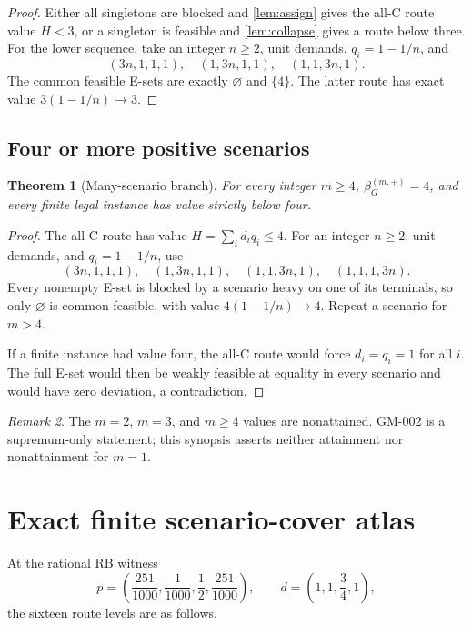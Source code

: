 \documentclass[11pt]{article}
\newtheorem{theorem}{Theorem}[section]
\theoremstyle{remark}
\newtheorem{remark}[theorem]{Remark}
\begin{document}
\begin{proof}
Either all singletons are blocked and \cref{lem:assign} gives the all-C route
value $H<3$, or a singleton is feasible and \cref{lem:collapse} gives a route
below three. For the lower sequence, take an integer $n\ge2$, unit demands,
$q_i=1-1/n$, and
\[
(3n,1,1,1),\quad(1,3n,1,1),\quad(1,1,3n,1).
\tag{3.6}
\]
The common feasible E-sets are exactly $\varnothing$ and $\{4\}$. The latter
route has exact value $3(1-1/n)\to3$.
\end{proof}

\subsection{Four or more positive scenarios}

\begin{theorem}[Many-scenario branch]\label{thm:m4}
For every integer $m\ge4$, $\beta_G^{(m,+)}=4$, and every finite legal
instance has value strictly below four.
\end{theorem}

\begin{proof}
The all-C route has value $H=\sum_i d_iq_i\le4$. For an integer $n\ge2$,
unit demands, and $q_i=1-1/n$, use
\[
(3n,1,1,1),\quad(1,3n,1,1),\quad
(1,1,3n,1),\quad(1,1,1,3n).
\tag{3.7}
\]
Every nonempty E-set is blocked by a scenario heavy on one of its terminals,
so only $\varnothing$ is common feasible, with value $4(1-1/n)\to4$. Repeat a
scenario for $m>4$.

If a finite instance had value four, the all-C route would force
$d_i=q_i=1$ for all $i$. The full E-set would then be weakly feasible at
equality in every scenario and would have zero deviation, a contradiction.
\end{proof}

\begin{remark}
The $m=2$, $m=3$, and $m\ge4$ values are nonattained. GM-002 is a
supremum-only statement; this synopsis asserts neither attainment nor
nonattainment for $m=1$.
\end{remark}

\section{Exact finite scenario-cover atlas}

At the rational RB witness
\[
p=\left(\frac{251}{1000},\frac1{1000},\frac12,
\frac{251}{1000}\right),\qquad
d=\left(1,1,\frac34,1\right),
\tag{4.1}
\]
the sixteen route levels are as follows.
\end{document}
